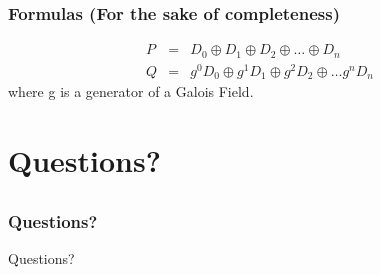 \documentclass{beamer}
\begin{document}
\begin{frame}
	\frametitle{Formulas (For the sake of completeness)}
	\begin{eqnarray}
		P &=& D_0 \oplus D_1 \oplus D_2 \oplus \dotsc \oplus D_n \\
		Q &=& g^0D_0 \oplus g^1D_1 \oplus g^2D_2 \oplus \dotsc g^nD_n 
	\end{eqnarray}
	where g is a generator of a Galois Field. 
\end{frame}

\section{Questions?}
\subsection*{}

\begin{frame}
	\frametitle{Questions?}
	\begin{center}
		\large Questions?
	\end{center}
\end{frame}
\end{document}
